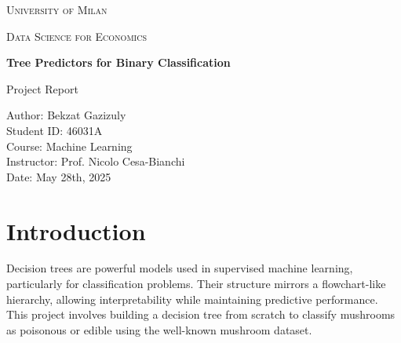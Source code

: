 \documentclass[11pt]{article}
\begin{document}
\begin{titlepage}
    \centering
    \vspace*{2cm}
    {\scshape\LARGE University of Milan \par}
    \vspace{1.5cm}
    {\scshape\Large Data Science for Economics\par}
    \vspace{2cm}
    {\Huge\bfseries Tree Predictors for Binary Classification\par}
    \vspace{1.5cm}
    {\Large Project Report\par}
    \vfill
    \vspace{0.8cm}
    \begin{flushright}
        \Large
        Author: Bekzat Gazizuly \\
        Student ID: 46031A \\
        Course: Machine Learning \\
        Instructor: Prof. Nicolo Cesa-Bianchi \\
        Date: May 28th, 2025
    \end{flushright}
\end{titlepage}



\begin{abstract}
This report describes the complete implementation from scratch of binary decision tree predictors to classify mushrooms as poisonous or edible. The dataset used includes various categorical attributes of mushrooms, and the objective is to build a reliable model using interpretable decision trees. Several splitting and stopping criteria are implemented and compared. Additionally, a Random Forest extension is introduced. 
\end{abstract}

\tableofcontents

\newpage

\section{Introduction}
Decision trees are powerful models used in supervised machine learning, particularly for classification problems. Their structure mirrors a flowchart-like hierarchy, allowing interpretability while maintaining predictive performance. This project involves building a decision tree from scratch to classify mushrooms as poisonous or edible using the well-known mushroom dataset. 
\end{document}
